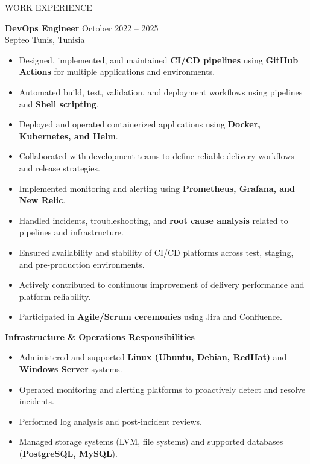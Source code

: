 \documentclass{resume}
\begin{document}
\begin{rSection}{WORK EXPERIENCE}

\textbf{DevOps Engineer} \hfill October 2022 -- 2025 \\
Septeo \hfill Tunis, Tunisia \\

\begin{itemize}
\itemsep -3pt
\item Designed, implemented, and maintained \textbf{CI/CD pipelines} using \textbf{GitHub Actions} for multiple applications and environments.
\item Automated build, test, validation, and deployment workflows using pipelines and \textbf{Shell scripting}.
\item Deployed and operated containerized applications using \textbf{Docker, Kubernetes, and Helm}.
\item Collaborated with development teams to define reliable delivery workflows and release strategies.
\item Implemented monitoring and alerting using \textbf{Prometheus, Grafana, and New Relic}.
\item Handled incidents, troubleshooting, and \textbf{root cause analysis} related to pipelines and infrastructure.
\item Ensured availability and stability of CI/CD platforms across test, staging, and pre-production environments.
\item Actively contributed to continuous improvement of delivery performance and platform reliability.
\item Participated in \textbf{Agile/Scrum ceremonies} using Jira and Confluence.
\end{itemize}

\vspace{0.4em}

\textbf{Infrastructure \& Operations Responsibilities}
\begin{itemize}
\itemsep -3pt
\item Administered and supported \textbf{Linux (Ubuntu, Debian, RedHat)} and \textbf{Windows Server} systems.
\item Operated monitoring and alerting platforms to proactively detect and resolve incidents.
\item Performed log analysis and post-incident reviews.
\item Managed storage systems (LVM, file systems) and supported databases (\textbf{PostgreSQL, MySQL}).
\end{itemize}


\end{rSection}
\end{document}
